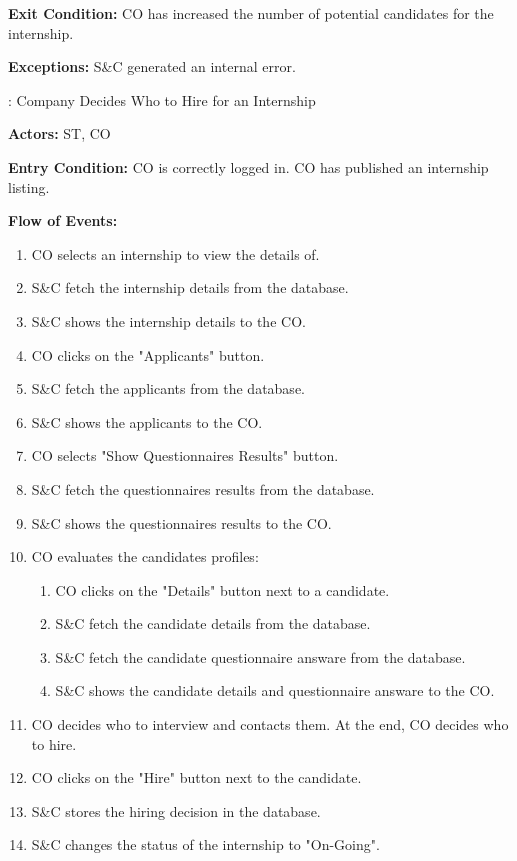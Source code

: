 \par \textbf{Exit Condition:} CO has increased the number of potential candidates for the internship.

\par \textbf{Exceptions:}  S\&C generated an internal error.

\nextUseCaseID: Company Decides Who to Hire for an Internship

\par \textbf{Actors:} ST, CO

\par \textbf{Entry Condition:} CO is correctly logged in. CO has published an internship listing.

\par \textbf{Flow of Events:}

\begin{enumerate}
    \item CO selects an internship to view the details of.
    \item S\&C fetch the internship details from the database.
    \item S\&C shows the internship details to the CO.
    \item CO clicks on the "Applicants" button.
    \item S\&C fetch the applicants from the database.
    \item S\&C shows the applicants to the CO.
    \item CO selects "Show Questionnaires Results" button.
    \item S\&C fetch the questionnaires results from the database.
    \item S\&C shows the questionnaires results to the CO.
    \item CO evaluates the candidates profiles:
    \begin{enumerate}
        \item CO clicks on the "Details" button next to a candidate.
        \item S\&C fetch the candidate details from the database.
        \item S\&C fetch the candidate questionnaire answare from the database.
        \item S\&C shows the candidate details and questionnaire answare to the CO.
    \end{enumerate}
    \item CO decides who to interview and contacts them. At the end, CO decides who to hire.
    \item CO clicks on the "Hire" button next to the candidate.
    \item S\&C stores the hiring decision in the database.
    \item S\&C changes the status of the internship to "On-Going".
\end{enumerate}

